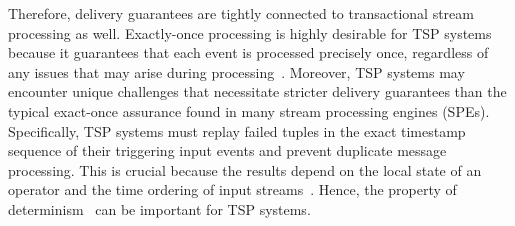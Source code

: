 Therefore, delivery guarantees are tightly connected to transactional stream processing as well. Exactly-once processing is highly desirable for TSP systems because it guarantees that each event is processed precisely once, regardless of any issues that may arise during processing~\cite{zhang2024survey}. Moreover, TSP systems may encounter unique challenges that necessitate stricter delivery guarantees than the typical exact-once assurance found in many stream processing engines (SPEs). Specifically, TSP systems must replay failed tuples in the exact timestamp sequence of their triggering input events and prevent duplicate message processing. This is crucial because the results depend on the local state of an operator and the time ordering of input streams~\cite{zhang2024survey}. Hence, the property of determinism~\cite{thepaper, Zacheilas:2017:MDS:3093742.3093921, palyvos2022research} can be important for TSP systems.

